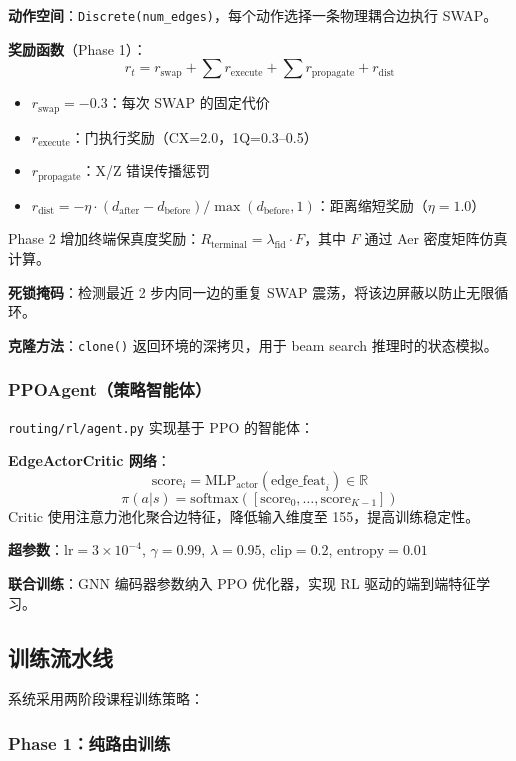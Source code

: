 \textbf{动作空间}：\texttt{Discrete(num\_edges)}，每个动作选择一条物理耦合边执行 SWAP。

\textbf{奖励函数}（Phase 1）：
\[
r_t = r_{\text{swap}} + \sum r_{\text{execute}} + \sum r_{\text{propagate}} + r_{\text{dist}}
\]
\begin{itemize}
  \item $r_{\text{swap}} = -0.3$：每次 SWAP 的固定代价
  \item $r_{\text{execute}}$：门执行奖励（CX=2.0，1Q=0.3--0.5）
  \item $r_{\text{propagate}}$：X/Z 错误传播惩罚
  \item $r_{\text{dist}} = -\eta \cdot (d_{\text{after}} - d_{\text{before}}) / \max(d_{\text{before}}, 1)$：距离缩短奖励（$\eta = 1.0$）
\end{itemize}

Phase 2 增加终端保真度奖励：$R_{\text{terminal}} = \lambda_{\text{fid}} \cdot F$，其中 $F$ 通过 Aer 密度矩阵仿真计算。

\textbf{死锁掩码}：检测最近 2 步内同一边的重复 SWAP 震荡，将该边屏蔽以防止无限循环。

\textbf{克隆方法}：\texttt{clone()} 返回环境的深拷贝，用于 beam search 推理时的状态模拟。

\subsubsection{PPOAgent（策略智能体）}

\texttt{routing/rl/agent.py} 实现基于 PPO 的智能体：

\textbf{EdgeActorCritic 网络}：
\[
\text{score}_i = \text{MLP}_{\text{actor}}(\text{edge\_feat}_i) \in \mathbb{R}
\]
\[
\pi(a|s) = \text{softmax}([\text{score}_0, \ldots, \text{score}_{K-1}])
\]
Critic 使用注意力池化聚合边特征，降低输入维度至 155，提高训练稳定性。

\textbf{超参数}：$\text{lr}=3\times10^{-4}$, $\gamma=0.99$, $\lambda=0.95$, $\text{clip}=0.2$, $\text{entropy}=0.01$

\textbf{联合训练}：GNN 编码器参数纳入 PPO 优化器，实现 RL 驱动的端到端特征学习。

\subsection{训练流水线}

系统采用两阶段课程训练策略：

\subsubsection{Phase 1：纯路由训练}

